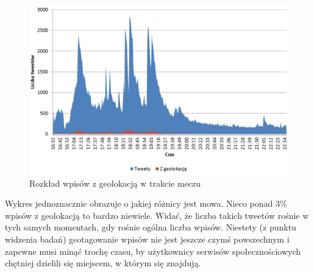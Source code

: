 \begin{figure}[ht!]
\centering
\includegraphics[width=120mm]{img/tweet-geo-w-meczu.PNG}
\caption{Rozkład wpisów z geolokacją w trakcie meczu}
\label{image:wpisy-odsetek-geotagged}
\end{figure}


Wykres jednoznacznie obrazuje o jakiej różnicy jest mowa. Nieco ponad 3\% 
wpisów z geolokacją to bardzo niewiele. Widać, że liczba takich tweetów
rośnie w tych samych momentach, gdy rośnie ogólna liczba wpisów.
Niestety (z punktu widzenia badań) geotagowanie wpisów
nie jest jeszcze czymś powszechnym i zapewne musi minąć trochę czasu,
by użytkownicy serwisów społecznościowych chętniej dzielili się miejscem,
w którym się znajdują.

